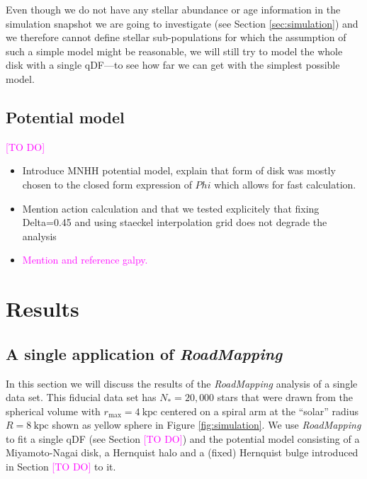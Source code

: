 \documentclass[iop,revtex4,numberedappendix,appendixfloats]{emulateapj}
\newcommand{\RM}{{\sl RoadMapping}}
\newcommand{\Wilma}[1]{\textcolor{Magenta}{#1}}
\begin{document}
Even though we do not have any stellar abundance or age information in the simulation snapshot we are going to investigate (see Section \ref{sec:simulation}) and we therefore cannot define stellar sub-populations for which the assumption of such a simple model might be reasonable, we will still try to model the whole disk with a single qDF---to see how far we can get with the simplest possible model.

\subsection{Potential model}

\Wilma{[TO DO]}

\begin{itemize}
\item Introduce MNHH potential model, explain that form of disk was mostly chosen to the closed form expression of $Phi$ which allows for fast calculation. 
\item Mention action calculation and that we tested explicitely that fixing Delta=0.45 and using staeckel interpolation grid does not degrade the analysis
\item \Wilma{Mention and reference galpy.}
\end{itemize}

\section{Results}

\subsection{A single application of \RM{}} \label{sec:results_part1}

In this section we will discuss the results of the \RM{} analysis of a single data set. This fiducial data set has $N_*=20,000$ stars that were drawn from the spherical volume with $r_\text{max}=4~\text{kpc}$ centered on a spiral arm at the ``solar'' radius $R=8~\text{kpc}$ shown as yellow sphere in Figure \ref{fig:simulation}. We use \RM{} to fit a single qDF (see Section \Wilma{[TO DO]}) and the potential model consisting of a Miyamoto-Nagai disk, a Hernquist halo and a (fixed) Hernquist bulge introduced in Section \Wilma{[TO DO]} to it.
\end{document}
